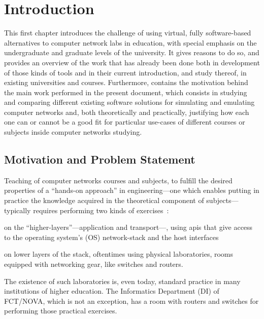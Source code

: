 
\chapter{Introduction}
\label{ch:introduction}

This first chapter introduces the challenge of using virtual, fully software-based alternatives to computer network labs in education, with special emphasis on the undergraduate and graduate levels of the university.
It gives reasons to do so, and provides an overview of the work that has already been done both in development of those kinds of tools and in their current introduction, and study thereof, in existing universities and courses.
Furthermore, contains the motivation behind the main work performed in the present document, which consists in studying and comparing different existing software solutions for simulating and emulating computer networks and, both theoretically and practically, justifying how each one can or cannot be a good fit for particular use-cases of different courses or subjects inside computer networks studying.

\section{Motivation and Problem Statement}
\label{sec:motivation}

Teaching of computer networks courses and subjects, to fulfill the desired properties of a ``hands-on approach'' in engineering---one which enables putting in practice the knowledge acquired in the theoretical component of subjects---typically requires performing two kinds of exercises~\cite{problembasedlearning}:
  \begin{enumerate*}[label=(\roman*), itemjoin={{, }}, itemjoin*={{, and }}]
  \item on the ``higher-layers''---application and transport---, using \glspl{api} that give access to the operating system's (OS) network-stack and the host interfaces
  \item on lower layers of the stack, oftentimes using physical laboratories, rooms equipped with networking gear, like switches and routers.
  \end{enumerate*}
The existence of such laboratories is, even today, standard practice in many institutions of higher education.
The Informatics Department (DI) of FCT/NOVA, which is not an exception, has a room with routers and switches for performing those practical exercises.


